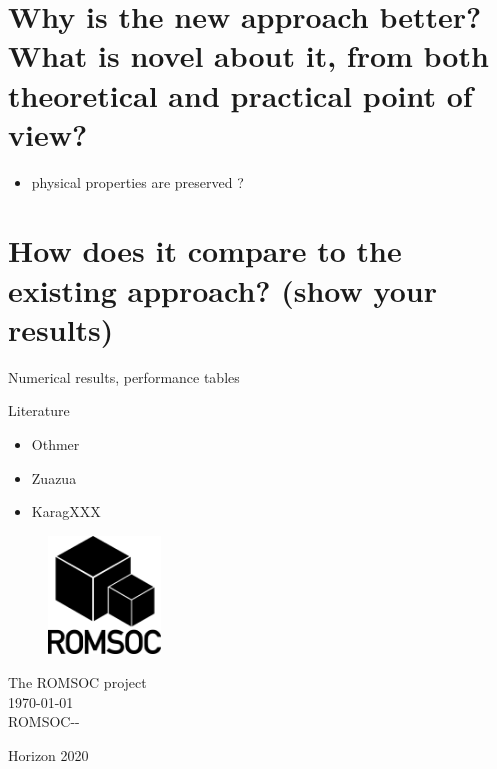 \documentclass{ROMSOC}
\begin{document}
\section{Why is the new approach better? What is novel about it, from both theoretical and practical point of view?}

\begin{itemize}
 \item physical properties are preserved ?
\end{itemize}

\section{How does it compare to the existing approach? (show your results)}

Numerical results, performance tables


\bigskip

Literature
\begin{itemize}
 \item Othmer
 \item Zuazua
 \item KaragXXX
\end{itemize}

%

%


\label{finalpg}
\clearpage

\thispagestyle{empty}
\begin{center}
\vfill
\begin{figure}
\centering
\vspace{7cm}
  \includegraphics[width=3cm]{images/ROMSOC_Logo_bw}
\end{figure}
\vfill
{\large The ROMSOC project\\[0.5cm] }
{\large \today \\[0.5cm] }
{\large ROMSOC-\DelNumber-\DelVersion\\[0.5cm] }
\vfill

Horizon 2020

\end{center}
\end{document}

